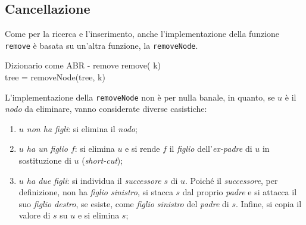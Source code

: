 \subsection{Cancellazione}
Come per la ricerca e l'inserimento, anche l'implementazione della funzione
\texttt{remove} è basata su un'altra funzione, la \texttt{removeNode}.

\begin{minicode}{Dizionario come ABR - remove}
    \ind remove( k)\\
        tree = removeNode(tree, k)
\end{minicode}\noindent
L'implementazione della \texttt{removeNode} non è per nulla banale, in quanto, se
$u$ è il \emph{nodo} da eliminare, vanno considerate diverse casistiche:
\begin{enumerate}
    \item \emph{$u$ non ha figli}: si elimina il \emph{nodo};
    \item \emph{$u$ ha un figlio $f$}: si elimina $u$ e si rende $f$ il \emph{figlio}
    dell'\emph{ex-padre} di $u$ in sostituzione di $u$ (\emph{short-cut});
    \item \emph{$u$ ha due figli}: si individua il \emph{successore} $s$ di $u$.
    Poiché il \emph{successore}, per definizione, non ha \emph{figlio sinistro},
    si stacca $s$ dal proprio \emph{padre} e si attacca il suo \emph{figlio
    destro}, se esiste, come \emph{figlio sinistro} del \emph{padre} di $s$.
    Infine, si copia il valore di $s$ su $u$ e si elimina $s$;
\end{enumerate}

